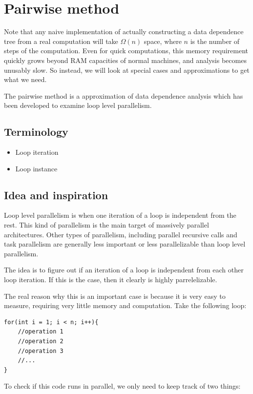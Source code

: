 \documentclass[12pt,twoside]{reedthesis}
\begin{document}
	\section{Pairwise method}
		
		Note that any naive implementation of actually constructing a data dependence tree from a real computation will take $\Omega(n)$ space, where $n$ is the number of steps of the computation. Even for quick computations, this memory requirement quickly grows beyond RAM capacities of normal machines, and analysis becomes unusably slow. So instead, we will look at special cases and approximations to get what we need. 
	
		The pairwise method is a approximation of data dependence analysis which has been developed to examine loop level parallelism. 
		
		\subsection{Terminology}
		\begin{itemize}
			\item Loop iteration
			\item Loop instance
		\end{itemize}
		
		\subsection{Idea and inspiration}
		
		Loop level parallelism is when one iteration of a loop is independent from the rest. This kind of parallelism is the main target of massively parallel architectures. Other types of parallelism, including parallel recursive calls and task parallelism are generally less important or less parallelizable than loop level parallelism. 
		
		The idea is to figure out if an iteration of a loop is independent from each other loop iteration. If this is the case, then it clearly is highly parrelelizable. 
		
		The real reason why this is an important case is because it is very easy to measure, requiring very little memory and computation. Take the following loop:
\begin{lstlisting}
for(int i = 1; i < n; i++){
	//operation 1
	//operation 2
	//operation 3
	//...
}
\end{lstlisting}
		
		
		To check if this code runs in parallel, we only need to keep track of two things:
		
\end{document}
